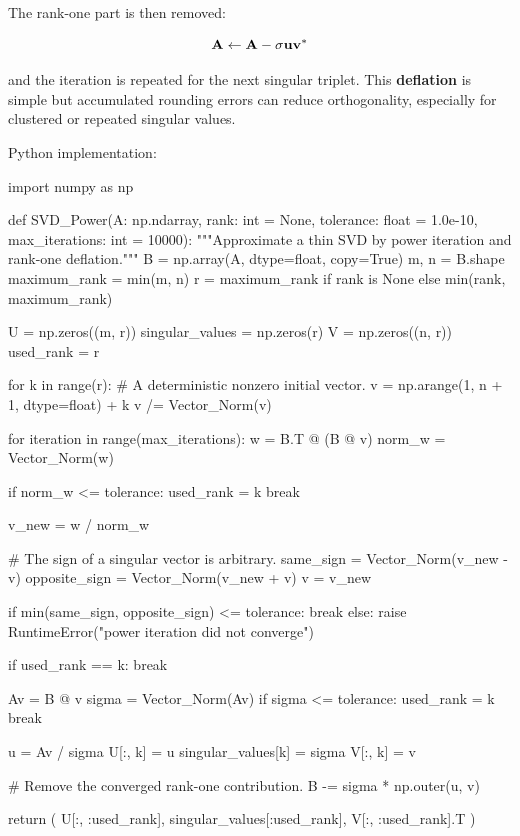 The rank-one part is then removed:

\begin{equation}
    \mathbf{A}\leftarrow\mathbf{A}-\sigma\mathbf{u}\mathbf{v}^{*}
\end{equation}

and the iteration is repeated for the next singular triplet. This
\textbf{deflation} is simple but accumulated rounding errors can reduce
orthogonality, especially for clustered or repeated singular values.

Python implementation:

\begin{python}
import numpy as np


def SVD_Power(A: np.ndarray,
              rank: int = None,
              tolerance: float = 1.0e-10,
              max_iterations: int = 10000):
    """Approximate a thin SVD by power iteration and rank-one deflation."""
    B = np.array(A, dtype=float, copy=True)
    m, n = B.shape
    maximum_rank = min(m, n)
    r = maximum_rank if rank is None else min(rank, maximum_rank)

    U = np.zeros((m, r))
    singular_values = np.zeros(r)
    V = np.zeros((n, r))
    used_rank = r

    for k in range(r):
        # A deterministic nonzero initial vector.
        v = np.arange(1, n + 1, dtype=float) + k
        v /= Vector_Norm(v)

        for iteration in range(max_iterations):
            w = B.T @ (B @ v)
            norm_w = Vector_Norm(w)

            if norm_w <= tolerance:
                used_rank = k
                break

            v_new = w / norm_w

            # The sign of a singular vector is arbitrary.
            same_sign = Vector_Norm(v_new - v)
            opposite_sign = Vector_Norm(v_new + v)
            v = v_new

            if min(same_sign, opposite_sign) <= tolerance:
                break
        else:
            raise RuntimeError("power iteration did not converge")

        if used_rank == k:
            break

        Av = B @ v
        sigma = Vector_Norm(Av)
        if sigma <= tolerance:
            used_rank = k
            break

        u = Av / sigma
        U[:, k] = u
        singular_values[k] = sigma
        V[:, k] = v

        # Remove the converged rank-one contribution.
        B -= sigma * np.outer(u, v)

    return (
        U[:, :used_rank],
        singular_values[:used_rank],
        V[:, :used_rank].T
    )
\end{python}

